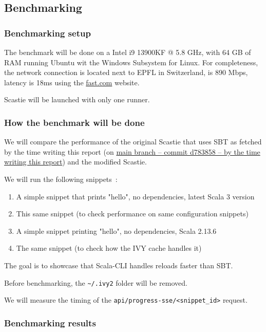 \documentclass{article}
\begin{document}
\subsection{Benchmarking}

\subsubsection{Benchmarking setup}

The benchmark will be done on a Intel i9 13900KF @ 5.8 GHz, with 64 GB of RAM running Ubuntu wit the Windows Subsystem for Linux. For completeness, the network connection is located next to EPFL in Switzerland, is 890 Mbps, latency is 18ms using the \href{https://fast.com}{fast.com} website.

Scastie will be launched with only one runner.

\subsubsection{How the benchmark will be done}

We will compare the performance of the original Scastie that uses SBT as fetched by the time writing this report (on \href{https://github.com/scalacenter/scastie/commit/d783858db0516eb5e7ed9f2a2101c85e8773afc0}{main branch -- commit d783858 -- by the time writing this report}) and the modified Scastie.


We will run the following snippets~:
\begin{enumerate}
    \item A simple snippet that prints "hello", no dependencies, latest Scala 3 version
    \item This same snippet (to check performance on same configuration snippets)
    \item A simple snippet printing "hello", no dependencies, Scala 2.13.6
    \item The same snippet (to check how the IVY cache handles it)
\end{enumerate}

The goal is to showcase that Scala-CLI handles reloads faster than SBT.

Before benchmarking, the \lstinline{~/.ivy2} folder will be removed.

We will measure the timing of the \lstinline{api/progress-sse/<snippet_id>} request.

\subsubsection{Benchmarking results}
\end{document}
